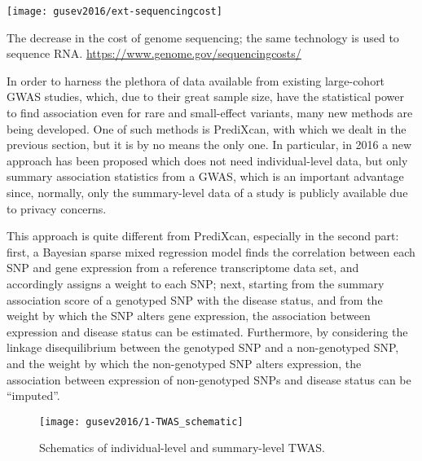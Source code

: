 \documentclass[../main.tex]{subfiles}
\begin{document}
\begin{marginfigure}[-5cm]
	\texttt{[image: gusev2016/ext-sequencingcost]}
	\caption[Sequencing cost over time]{The decrease in the cost of 
	genome sequencing; the same technology is used to sequence RNA. 
	\url{https://www.genome.gov/sequencingcosts/}}
\end{marginfigure}

In order to harness the plethora of data available from existing 
large-cohort GWAS studies, which, due to their great sample size, have 
the statistical power to find association even for rare and small-effect 
variants, many new methods are being developed. One of such methods is 
PrediXcan, with which we dealt in the previous section, but it is by no 
means the only one. In particular, in 2016 a new approach has been 
proposed which does not need individual-level data, but only summary 
association statistics from a GWAS, which is an important advantage since, 
normally, only the summary-level data of a study is publicly available 
due to privacy concerns.

This approach is quite different from PrediXcan, especially in the 
second part: first, a Bayesian sparse mixed regression model finds the 
correlation between each SNP and gene expression from a reference 
transcriptome data set, and accordingly assigns a weight to each SNP; 
next, starting from the summary association score of a genotyped SNP 
with the disease status, and from the weight by which the SNP alters 
gene expression, the association between expression and disease status 
can be estimated. Furthermore, by considering the linkage disequilibrium 
between the genotyped SNP and a non-genotyped SNP, and the weight by 
which the non-genotyped SNP alters expression, the association between 
expression of non-genotyped SNPs and disease status can be 
\enquote{imputed}.

\begin{figure}
	\texttt{[image: gusev2016/1-TWAS\_schematic]}
	\caption{Schematics of individual-level and summary-level TWAS.}
\end{figure}
\end{document}
